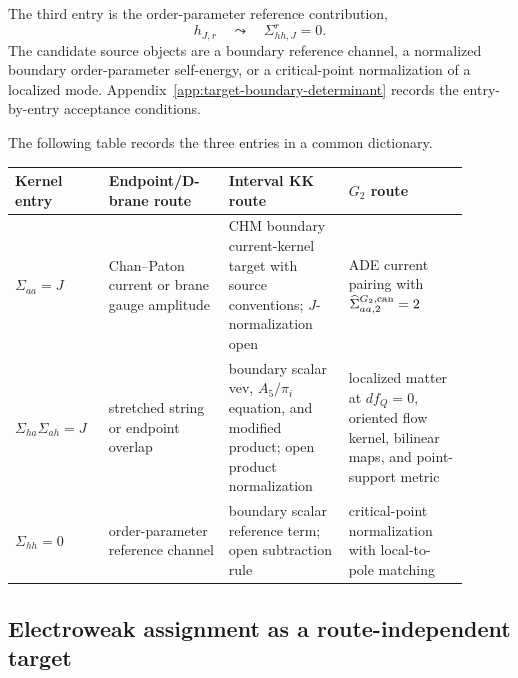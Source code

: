 The third entry is the order-parameter reference contribution,
\begin{equation}
  h_{J,r}
  \quad\leadsto\quad
  \Sigma_{hh,J}^{r}=0.
  \label{eq:route-h-reference}
\end{equation}
The candidate source objects are a boundary reference channel, a normalized
boundary order-parameter self-energy, or a critical-point normalization of a
localized mode.  Appendix~\ref{app:target-boundary-determinant} records the
entry-by-entry acceptance conditions.

The following table records the three entries in a common dictionary.
\begin{center}
\small
\begin{tabular}{p{0.18\linewidth}p{0.24\linewidth}p{0.24\linewidth}p{0.24\linewidth}}
\toprule
Kernel entry & Endpoint/D-brane route & Interval KK route & \(G_2\) route\\
\midrule
\(\Sigma_{aa}=J\) & Chan--Paton current or brane gauge amplitude & CHM boundary current-kernel target with source conventions; \(J\)-normalization open & ADE current pairing with \(\widehat\Sigma_{aa,2}^{G_2,{\rm can}}=2\)\\
\(\Sigma_{ha}\Sigma_{ah}=J\) & stretched string or endpoint overlap & boundary scalar vev, \(A_5/\pi_i\) equation, and modified product; open product normalization & localized matter at \(df_Q=0\), oriented flow kernel, bilinear maps, and point-support metric\\
\(\Sigma_{hh}=0\) & order-parameter reference channel & boundary scalar reference term; open subtraction rule & critical-point normalization with local-to-pole matching\\
\bottomrule
\end{tabular}
\end{center}

\subsection{Electroweak assignment as a route-independent target}
\label{sec:route-ew-assignment}


